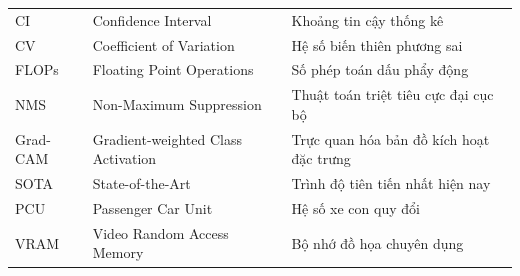 \documentclass[12pt,a4paper,oneside]{report}
\begin{document}
\begin{table}[H]
\begin{tabularx}{\textwidth}{l p{4.5cm} X}
CI & Confidence Interval & Khoảng tin cậy thống kê \\
CV & Coefficient of Variation & Hệ số biến thiên phương sai \\
FLOPs & Floating Point Operations & Số phép toán dấu phẩy động \\
NMS & Non-Maximum Suppression & Thuật toán triệt tiêu cực đại cục bộ \\
Grad-CAM & Gradient-weighted Class Activation & Trực quan hóa bản đồ kích hoạt đặc trưng \\
SOTA & State-of-the-Art & Trình độ tiên tiến nhất hiện nay \\
PCU & Passenger Car Unit & Hệ số xe con quy đổi \\
VRAM & Video Random Access Memory & Bộ nhớ đồ họa chuyên dụng \\
\bottomrule
\end{tabularx}
\end{table}

\newpage
{}
\setcounter{page}{1}
















\end{document}
